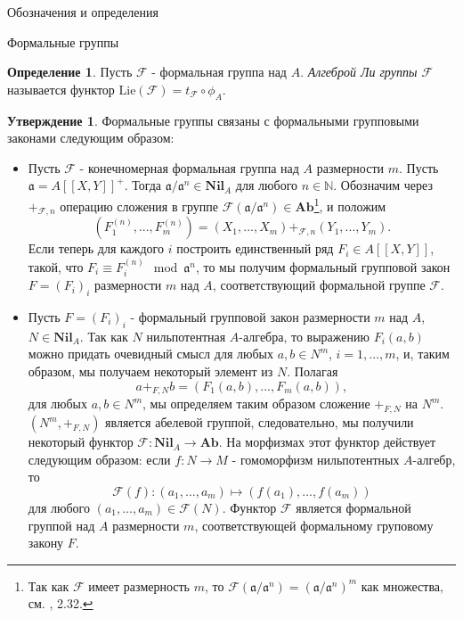\documentclass[a4paper,14pt]{extarticle}
\theoremstyle{definition}
\newtheorem{definition}{Определение}[section]
\newtheorem{claim}[theorem]{Утверждение}
\newcommand{\Ab}{\mathbf{Ab}}
\newcommand{\forget}[1]{\phi_{#1}}
\newcommand{\Lie}[1]{\mathrm{Lie}\left(#1\right)}
\newcommand{\Nil}[1]{\mathbf{Nil}_{#1}}
\newcommand{\bN}{\mathbb{N}}
\newcommand{\fa}{\mathfrak{a}}
\newcommand{\sF}{\mathscr{F}}
\begin{document}
\begin{section}{Обозначения и определения}
\begin{subsection}{Формальные группы}
\begin{definition}\label{denote:3.2:lie_algebra_functor}
    Пусть $\sF$ - формальная группа над $A$. \textit{Алгеброй Ли группы $\sF$} называется функтор ${ \Lie{\sF} = t_\sF \circ \forget{A} }$.
\end{definition}

\begin{claim}\label{claim:3.4:groups_and_laws_correspondence}
    Формальные группы связаны с формальными групповыми законами следующим образом:
    \begin{itemize}
        \item Пусть $\sF$ - конечномерная формальная группа над $A$ размерности $m$. Пусть ${ \fa = A[[X, Y]]^+ }$. Тогда ${ \fa / \fa^n \in \Nil{A} }$ для любого ${ n \in \bN }$. Обозначим через $+_{\sF, n}$ операцию сложения в группе ${ \sF(\fa / \fa^n) \in \Ab }$\footnote{
            Так как $\sF$ имеет размерность $m$, то ${ \sF(\fa / \fa^n) = \left( \fa / \fa^n \right)^m }$ как множества, см. \cite{Zink}, 2.32.
        }, и положим
        \begin{equation*}
            \left(
                F_1^{(n)}, ..., F_m^{(n)}
            \right) =
            (X_1, ..., X_m) +_{\sF, n} (Y_1, ..., Y_m).
        \end{equation*}
        Если теперь для каждого $i$ построить единственный ряд ${ F_i \in A[[X, Y]] }$, такой, что ${ F_i \equiv F_i^{(n)} \mod \fa^n }$, то мы получим формальный групповой закон ${ F = (F_i)_i }$ размерности $m$ над $A$, соответствующий формальной группе $\sF$.
        \item Пусть ${ F = (F_i)_i }$ - формальный групповой закон размерности $m$ над $A$, ${ N \in \Nil{A} }$. Так как $N$ нильпотентная $A$-алгебра, то выражению ${ F_i(a, b) }$ можно придать очевидный смысл для любых ${ a, b \in N^m }$, ${ i = 1,..., m }$, и, таким образом, мы получаем некоторый элемент из $N$. Полагая
        \begin{equation*}
            a +_{F, N} b =
            (F_1(a, b), ..., F_m(a, b)),
        \end{equation*}
        для любых ${ a, b \in N^m }$, мы определяем таким образом сложение $+_{F, N}$ на $N^m$. ${ (N^m, +_{F, N}) }$ является абелевой группой, следовательно, мы получили некоторый функтор ${ \sF : \Nil{A} \rightarrow \Ab }$. На морфизмах этот функтор действует следующим образом: если ${ f : N \rightarrow M }$ - гомоморфизм нильпотентных $A$-алгебр, то
        \begin{equation*}
            \sF(f) :
            (a_1, ..., a_m) \mapsto
            (f(a_1), ..., f(a_m))
        \end{equation*}
        для любого ${ (a_1, ..., a_m) \in \sF(N) }$. Функтор $\sF$ является формальной группой над $A$ размерности $m$, соответствующей формальному груповому закону $F$.
    \end{itemize}
\end{claim}


\end{subsection}
\end{section}
\end{document}
